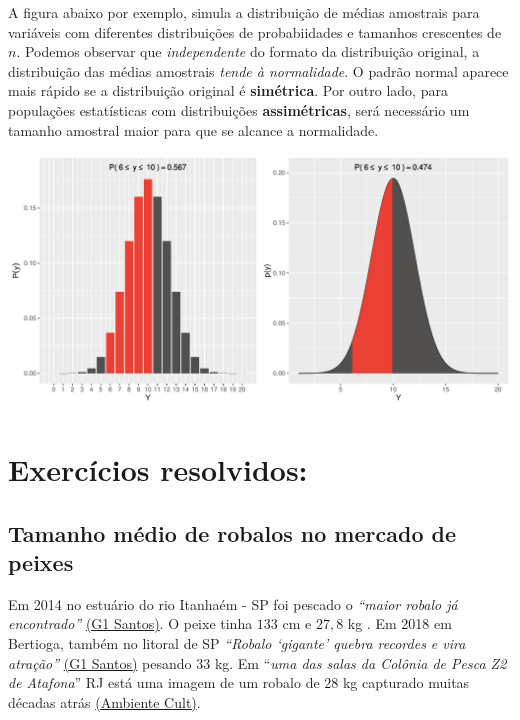 \documentclass[
]{book}
\begin{document}
A figura abaixo por exemplo, simula a distribuição de médias amostrais para variáveis com diferentes distribuições de probabiidades e tamanhos crescentes de \(n\). Podemos observar que \emph{independente} do formato da distribuição original, a distribuição das médias amostrais \emph{tende à normalidade}. O padrão normal aparece mais rápido se a distribuição original é \textbf{simétrica}. Por outro lado, para populações estatísticas com distribuições \textbf{assimétricas}, será necessário um tamanho amostral maior para que se alcance a normalidade.

\includegraphics{probest-cambientais_files/figure-latex/unnamed-chunk-107-1.pdf}

\hypertarget{exercuxedcios-resolvidos-1}{%
\section{Exercícios resolvidos:}\label{exercuxedcios-resolvidos-1}}

\hypertarget{tamanho-muxe9dio-de-robalos-no-mercado-de-peixes}{%
\subsection{Tamanho médio de robalos no mercado de peixes}\label{tamanho-muxe9dio-de-robalos-no-mercado-de-peixes}}

Em 2014 no estuário do rio Itanhaém - SP foi pescado o \emph{``maior robalo já encontrado''} \href{http://g1.globo.com/sp/santos-regiao/noticia/2014/11/pescador-fisga-em-itanhaem-o-maior-robalo-ja-encontrado-briguei-com-ele.html}{(G1 Santos)}. O peixe tinha \(133\) cm e \(27,8\) kg . Em 2018 em Bertioga, também no litoral de SP \emph{``Robalo `gigante' quebra recordes e vira atração''} \href{https://g1.globo.com/sp/santos-regiao/noticia/robalo-gigante-quebra-recordes-e-vira-atracao-durante-pescaria-em-sp.ghtml}{(G1 Santos)} pesando \(33\) kg. Em ``\emph{uma das salas da Colônia de Pesca Z2 de Atafona}'' RJ está uma imagem de um robalo de \(28\) kg capturado muitas décadas atrás \href{http://ambientecult.blogspot.com/2010/10/ponto-de-memoria-foto-da-pesca.html}{(Ambiente Cult)}.
\end{document}
